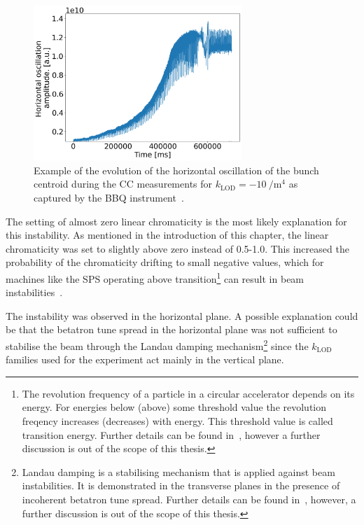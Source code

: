 \begin{figure}[!h]
   \centering         
   \includegraphics[width=0.7\textwidth]{images/Ch8/2022.05.16.17.49.04.430450.png}
       \caption{Example of the evolution of the horizontal oscillation of the bunch centroid during the CC measurements for $k_\mathrm{LOD}=-10 \ \mathrm{/m^4}$ as captured by the BBQ instrument~\cite{Boccardi:1055568}.}
       \label{fig:instability_BBQ_klod-15_4may2022}
\end{figure}


The setting of almost zero linear chromaticity is the most likely explanation for this instability. As mentioned in the introduction of this chapter, the linear chromaticity was set to slightly above zero instead of 0.5-1.0. %
This increased the probability of the chromaticity drifting to small negative values, which for machines like the SPS operating above transition\footnote{The revolution frequency of a particle in a circular accelerator depends on its energy. For energies below (above) some threshold value the revolution freqency increases (decreases) with energy. This threshold value is called transition energy. Further details can be found in~\cite{wolski2014}, however a further discussion is out of the scope of this thesis.} can result in beam instabilities~\cite{collective_effects_cas_li}. %

The instability was observed in the horizontal plane. A possible explanation could be that the betatron tune spread in the horizontal plane was not sufficient to stabilise the beam through the Landau damping mechanism\footnote{Landau damping is a stabilising mechanism that is applied against beam instabilities. It is demonstrated in the transverse planes in the presence of incoherent betatron tune spread. Further details can be found in~\cite{Herr:1982428, Schenk:2665819}, however, a further discussion is out of the scope of this thesis.} since the $k_\mathrm{LOD}$ families used for the experiment act mainly in the vertical plane.


